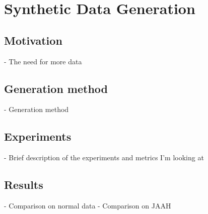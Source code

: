 \chapter{Synthetic Data Generation}

\section{Motivation}
- The need for more data
\section{Generation method}
- Generation method

\section{Experiments}
- Brief description of the experiments and metrics I'm looking at

\section{Results}
- Comparison on normal data
- Comparison on JAAH